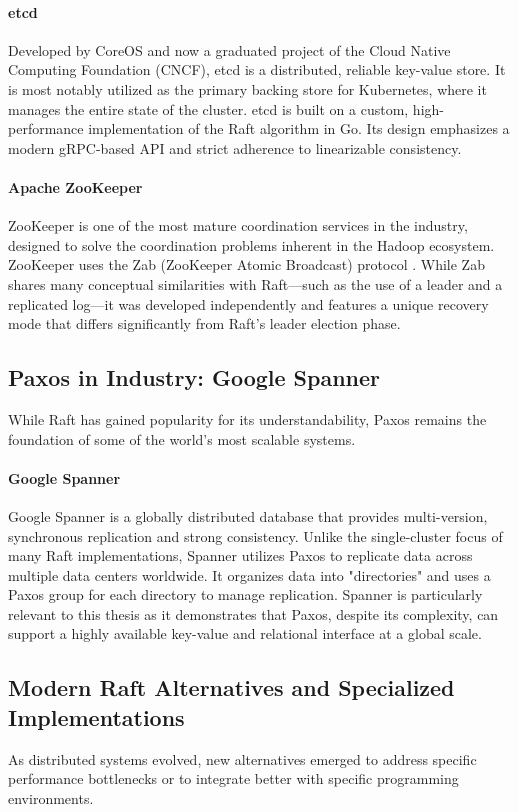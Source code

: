 \paragraph{etcd} 
Developed by CoreOS and now a graduated project of the Cloud Native Computing Foundation (CNCF), etcd \cite{etcd} is a distributed, reliable key-value store. It is most notably utilized as the primary backing store for Kubernetes, where it manages the entire state of the cluster. etcd is built on a custom, high-performance implementation of the Raft algorithm in Go. Its design emphasizes a modern gRPC-based API and strict adherence to linearizable consistency. 

\paragraph{Apache ZooKeeper} 
ZooKeeper \cite{Hunt2010} is one of the most mature coordination services in the industry, designed to solve the coordination problems inherent in the Hadoop ecosystem. ZooKeeper uses the Zab (ZooKeeper Atomic Broadcast) protocol \cite{Zab2011}. While Zab shares many conceptual similarities with Raft—such as the use of a leader and a replicated log—it was developed independently and features a unique recovery mode that differs significantly from Raft's leader election phase.

\subsection{Paxos in Industry: Google Spanner}
While Raft has gained popularity for its understandability, Paxos remains the foundation of some of the world's most scalable systems. 

\paragraph{Google Spanner} 
Google Spanner \cite{Spanner2013} is a globally distributed database that provides multi-version, synchronous replication and strong consistency. Unlike the single-cluster focus of many Raft implementations, Spanner utilizes Paxos to replicate data across multiple data centers worldwide. It organizes data into "directories" and uses a Paxos group for each directory to manage replication. Spanner is particularly relevant to this thesis as it demonstrates that Paxos, despite its complexity, can support a highly available key-value and relational interface at a global scale.

\subsection{Modern Raft Alternatives and Specialized Implementations}
As distributed systems evolved, new alternatives emerged to address specific performance bottlenecks or to integrate better with specific programming environments.

